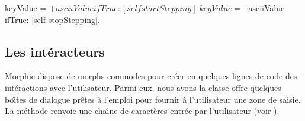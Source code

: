 \documentclass[a4paper,10pt,twoside]{book}
\begin{document}

\begin{code}{}
	keyValue = $+ asciiValue 
		ifTrue: [self startStepping].
	keyValue = $- asciiValue
		ifTrue: [self stopStepping].
\end{code}


\subsection{Les int\'eracteurs} %

Morphic dispose de morphs commodes pour cr\'eer en quelques lignes de
code des int\'eractions avec l'utilisateur. Parmi eux, nous avons la
classe  offre quelques bo\^{\i}tes de dialogue
pr\^etes \`a l'emploi pour fournir \`a l'utilisateur une zone de saisie.
La m\'ethode  renvoie
une cha\^{\i}ne de caract\`eres entr\'ee par l'utilisateur (voir
).
\end{document}
